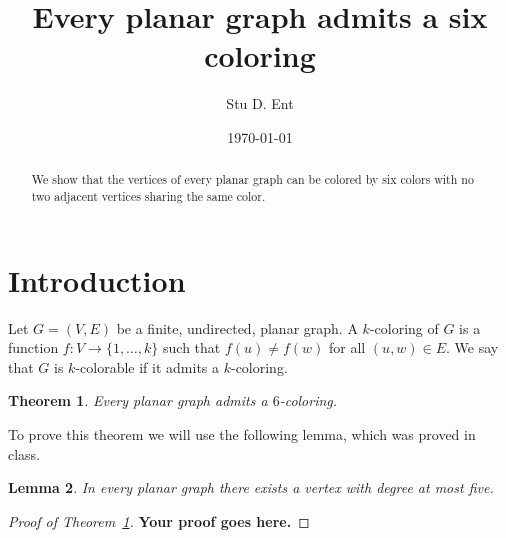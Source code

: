 \documentclass[12pt]{amsart}
\newtheorem{theorem}{Theorem}
\newtheorem{lemma}[theorem]{Lemma}
\theoremstyle{definition}
\numberwithin{equation}{section}
\numberwithin{theorem}{section}
\begin{document}
\title[]{Every planar graph admits a six coloring}

\author[]{Stu D. Ent}
\address{Department of Mathematics, Massachusetts Institute of Technology}


\date{\today}


\begin{abstract}
  We show that the vertices of every planar graph can be colored by
  six colors with no two adjacent vertices sharing the same color.
\end{abstract}

\maketitle

\section{Introduction}
Let $G = (V,E)$ be a finite, undirected, planar graph. A $k$-coloring
of $G$ is a function $f \colon V \to \{1,\ldots,k\}$ such that $f(u)
\neq f(w)$ for all $(u,w) \in E$. We say that $G$ is $k$-colorable if
it admits a $k$-coloring.

\begin{theorem}
  \label{thm:six-coloring}
  Every planar graph admits a $6$-coloring.
\end{theorem}

To prove this theorem we will use the following lemma, which was
proved in class.
\begin{lemma}
  \label{lemma:degree-five}
  In every planar graph there exists a vertex with degree at most five.
\end{lemma}


\begin{proof}[Proof of Theorem~\ref{thm:six-coloring}]
  {\bf Your proof goes here.}
\end{proof}
\end{document}
